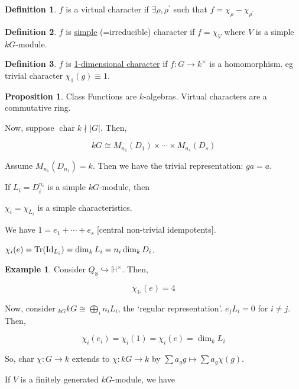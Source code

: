 \documentclass{article}
\theoremstyle{definition}
\newtheorem*{example}{Example}
\newtheorem*{definition}{Definition}
\newtheorem{proposition}[theorem]{Proposition}
\newcommand{\Char}{\operatorname{char}}
\begin{document}
\begin{definition}
    \(f\) is a virtual character if \(\exists \rho , \rho ^{\prime} \) such that \(f = \chi _ \rho - \chi _ {\rho ^{\prime} }\) 
\end{definition}

\begin{definition}
    \(f\) is \underline{simple} (=irreducible) character if \(f = \chi _ V\) where \(V\) is a simple \(kG\)-module.
\end{definition}

\begin{definition}
    \(f\) is \underline{1-dimensional character} if \(f : G \to k^\times\) is a homomorphism. eg trivial character \(\chi_1 (g) \equiv 1\). 
\end{definition}

\begin{proposition}
    Class Functions are \(k\)-algebras. Virtual characters are a commutative ring.
\end{proposition}

Now, suppose \(\Char k \nmid \vert G \vert\). Then,

\[
    kG \cong M_{n_1}(D_1) \times \cdots \times M_{n_s}(D_s)
\]

Assume \(M_{n_1}(D_{n_1})=k\). Then we have the trivial representation: \(ga = a\).

If \(L_i = D_i^{n_i}\) is a simple \(kG\)-module, then

\(\chi_i = \chi_{L_i}\) is a simple characteristics.

We have \(1 = e_1 + \cdots + e_s\) [central non-trivial idempotents].

\(\chi_i(e) = \Tr(\operatorname{Id}_{L_i}) = \dim_k L_i = n_i \dim_k D_i\).

\begin{example}
    Consider \(Q_8 \hookrightarrow \mathbb{H} ^\times\). Then,

    \[
        \chi_{\mathbb{H}}(e) = 4
    \]
\end{example}

Now, consider \(_{kG}kG \cong \bigoplus_{i} n_i L_i\), the `regular representation'. \(e_j L_i = 0\) for \(i \neq j\). Then,

\[
    \chi_i(e_i) = \chi_i(1) = \chi_i(e) = \dim_k L_i
\]

So, char \(\chi: G \to k\) extends to \(\chi : kG \to k\) by \(\sum a_g g \mapsto \sum a_g \chi (g)\).  

If \(V\) is a finitely generated \(kG\)-module, we have
\end{document}
